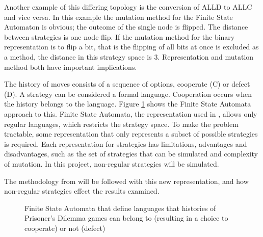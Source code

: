 \documentclass[a4paper,11pt]{article}
\begin{document}
Another example of this differing topology is the conversion of ALLD to ALLC and vice versa. 
In this example the mutation method for the Finite State Automaton is obvious; the outcome of the single node is flipped. 
The distance between strategies is one node flip. 
If the mutation method for the binary representation is to flip a bit, that is the flipping of all bits at once is excluded as a method, the distance in this strategy space is 3. 
Representation and mutation method both have important implications.

The history of moves consists of a sequence of options, cooperate (C) or defect (D). 
A strategy can be considered a formal language. 
Cooperation occurs when the history belongs to the language. 
Figure \ref{fig:fsa.lang} shows the Finite State Automata approach to this. 
Finite State Automata, the representation used in \citet{van-veelen:PNAS:2012}, allows only regular languages, which restricts the strategy space. 
To make the problem tractable, some representation that only represents a subset of possible strategies is required. 
Each representation for strategies has limitations, advantages and disadvantages, such as the set of strategies that can be simulated and complexity of mutation. 
In this project, non-regular strategies will be simulated.

The methodology from \citet{van-veelen:PNAS:2012} will be followed with this new representation, and how non-regular strategies effect the results examined.

\begin{figure}[h]
\hfill
{}\hfill
{}\hfill
\caption{Finite State Automata that define languages that histories of Prisoner's Dilemma games can belong to (resulting in a choice to cooperate) or not (defect)}
\label{fig:fsa.lang}
\end{figure}
\end{document}
